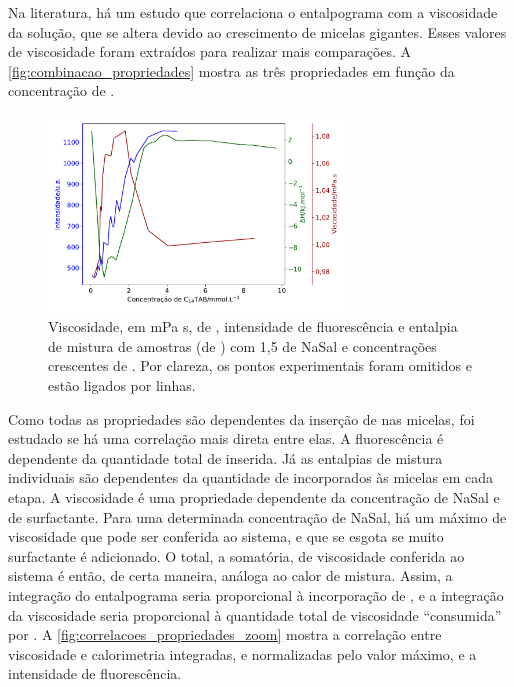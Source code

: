 	Na literatura, há um estudo que correlaciona o entalpograma com a viscosidade da solução, que se altera devido ao crescimento de micelas gigantes.\cite{Ito2015c} Esses valores de viscosidade foram extraídos para realizar mais comparações. A \autoref{fig:combinacao_propriedades} mostra as três propriedades em função da concentração de \TTAB.
	
	\begin{figure}[h]
		\centering
		\includegraphics[width=0.7\textwidth]{imagens/fluor/combinacao_propriedades}
		\caption{Viscosidade, em mPa s, de \cite{Ito2015c}, intensidade de fluorescência e entalpia de mistura de amostras (de \cite{Ito2015c}) com 1,5 \mM{} de NaSal e concentrações crescentes de \TTAB. Por clareza, os pontos experimentais foram omitidos e estão ligados por linhas.}
		\label{fig:combinacao_propriedades}
	\end{figure} 
	
	Como todas as propriedades são dependentes da inserção de \Sal{} nas micelas, foi estudado se há uma correlação mais direta entre elas. A fluorescência é dependente da quantidade total de \Sal{} inserida. Já as entalpias de mistura individuais são dependentes da quantidade de \Sal{} incorporados às micelas em cada etapa. A viscosidade é uma propriedade dependente da concentração de NaSal e de surfactante. Para uma determinada concentração de NaSal, há um máximo de viscosidade que pode ser conferida ao sistema, e que se esgota se muito surfactante é adicionado. O total, a somatória, de viscosidade conferida ao sistema é então, de certa maneira, análoga ao calor de mistura. Assim, a integração do entalpograma seria proporcional à incorporação de \Sal{}, e a integração da viscosidade seria proporcional à quantidade total de viscosidade ``consumida'' por \TTAB. A  \autoref{fig:correlacoes_propriedades_zoom} mostra a correlação entre viscosidade e calorimetria integradas, e normalizadas pelo valor máximo, e a intensidade de fluorescência.
	
